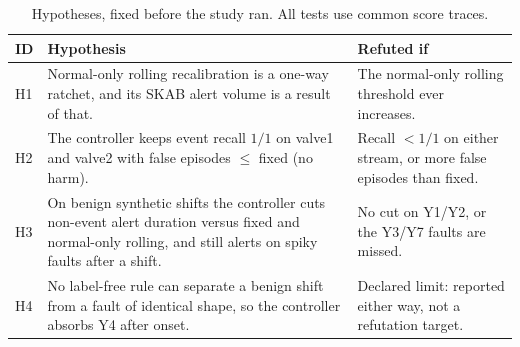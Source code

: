 \begin{table}[H]
  \centering
  \caption{Hypotheses, fixed before the study ran. All tests use common score traces.}
  \label{tab:hyp}
  \small
  \begin{tabularx}{\linewidth}{@{}lXX@{}}
    \toprule
    ID & Hypothesis & Refuted if\\
    \midrule
    H1 & Normal-only rolling recalibration is a one-way ratchet, and its SKAB alert volume is a result of that. & The normal-only rolling threshold ever increases.\\
    H2 & The controller keeps event recall $1/1$ on valve1 and valve2 with false episodes $\le$ fixed (no harm). & Recall $<1/1$ on either stream, or more false episodes than fixed.\\
    H3 & On benign synthetic shifts the controller cuts non-event alert duration versus fixed and normal-only rolling, and still alerts on spiky faults after a shift. & No cut on Y1/Y2, or the Y3/Y7 faults are missed.\\
    H4 & No label-free rule can separate a benign shift from a fault of identical shape, so the controller absorbs Y4 after onset. & Declared limit: reported either way, not a refutation target.\\
    \bottomrule
  \end{tabularx}
\end{table}
